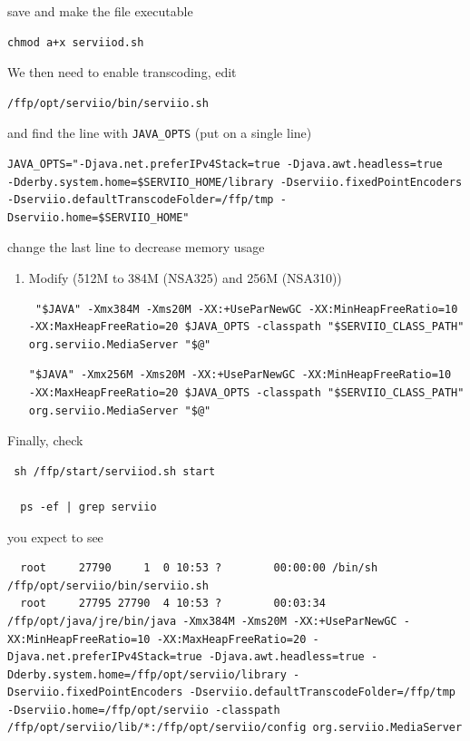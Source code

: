 save and make the file executable
\begin{verbatim}
chmod a+x serviiod.sh
\end{verbatim}

We then need to enable transcoding, edit 
\begin{verbatim}
/ffp/opt/serviio/bin/serviio.sh
\end{verbatim}
and find the line with \verb!JAVA_OPTS! (put on a single line)
{\tiny
\begin{verbatim}
JAVA_OPTS="-Djava.net.preferIPv4Stack=true -Djava.awt.headless=true
-Dderby.system.home=$SERVIIO_HOME/library -Dserviio.fixedPointEncoders 
-Dserviio.defaultTranscodeFolder=/ffp/tmp -Dserviio.home=$SERVIIO_HOME"
\end{verbatim}
}
change the last line to decrease memory usage 
\begin{enumerate}
  \item Modify (512M to 384M (NSA325) and 256M (NSA310))

{\tiny
\begin{verbatim}
 "$JAVA" -Xmx384M -Xms20M -XX:+UseParNewGC -XX:MinHeapFreeRatio=10
-XX:MaxHeapFreeRatio=20 $JAVA_OPTS -classpath "$SERVIIO_CLASS_PATH" org.serviio.MediaServer "$@"
\end{verbatim}
}  
\begin{verbatim}
"$JAVA" -Xmx256M -Xms20M -XX:+UseParNewGC -XX:MinHeapFreeRatio=10
-XX:MaxHeapFreeRatio=20 $JAVA_OPTS -classpath "$SERVIIO_CLASS_PATH" org.serviio.MediaServer "$@"
\end{verbatim}
\end{enumerate}


Finally, check
\begin{verbatim}
 sh /ffp/start/serviiod.sh start
 
  ps -ef | grep serviio
\end{verbatim}
you expect to see
\begin{verbatim}
  root     27790     1  0 10:53 ?        00:00:00 /bin/sh /ffp/opt/serviio/bin/serviio.sh
  root     27795 27790  4 10:53 ?        00:03:34 /ffp/opt/java/jre/bin/java -Xmx384M -Xms20M -XX:+UseParNewGC -XX:MinHeapFreeRatio=10 -XX:MaxHeapFreeRatio=20 -Djava.net.preferIPv4Stack=true -Djava.awt.headless=true -Dderby.system.home=/ffp/opt/serviio/library -Dserviio.fixedPointEncoders -Dserviio.defaultTranscodeFolder=/ffp/tmp -Dserviio.home=/ffp/opt/serviio -classpath /ffp/opt/serviio/lib/*:/ffp/opt/serviio/config org.serviio.MediaServer
\end{verbatim}

